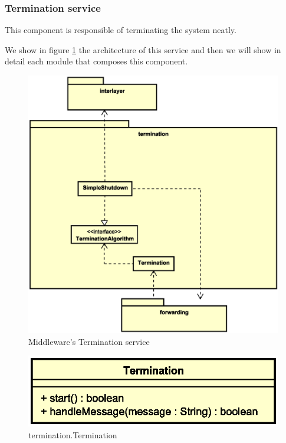 \subsubsection{Termination service}
This component is responsible of terminating the system neatly.

We show in figure \ref{fig:mw-termination} the architecture of this service and
then we will show in detail each module that composes this component.

\begin{figure}[H]
  \centering
  \includegraphics[width=\columnwidth]{images/solution/mw/termination.eps}
  \caption{Middleware's Termination service}
  \label{fig:mw-termination}
\end{figure}


\begin{figure}[H]
  \centering
  \includegraphics[width=.5\columnwidth]{images/solution/mw/ter/ter.eps}
  \caption{termination.Termination}
  \label{fig:mw-termination-termination}
\end{figure}

